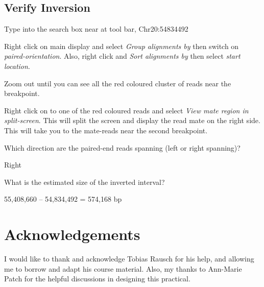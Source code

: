 \subsection{Verify Inversion}
\begin{advanced}
\begin{steps}

Type into the search box near at tool bar, Chr20:54834492 

Right click on main display and select \emph{Group alignments by} then switch on \emph{paired-orientation}. Also, right click and \emph{Sort alignments by} then select \emph{start location}. 

Zoom out until you can see all the red coloured cluster of reads near the breakpoint. 

Right click on to one of the red coloured reads and select \emph{View mate region in split-screen}. This will split the screen and display the read mate on the right side. This will take you to the mate-reads near the second breakpoint. 
\end{steps}
\end{advanced}


\begin{questions}
Which direction are the paired-end reads spanning (left or right spanning)?  
\begin{answer}
Right
\end{answer}
What is the estimated size of the inverted interval? 
\begin{answer}
55,408,660 – 54,834,492 = 574,168 bp
\end{answer}
\end{questions}

\section{Acknowledgements}

I would like to thank and acknowledge Tobias Rausch for his help, and allowing me to borrow and adapt his course material. Also, my thanks to Ann-Marie Patch for the helpful discussions in designing this practical. 



